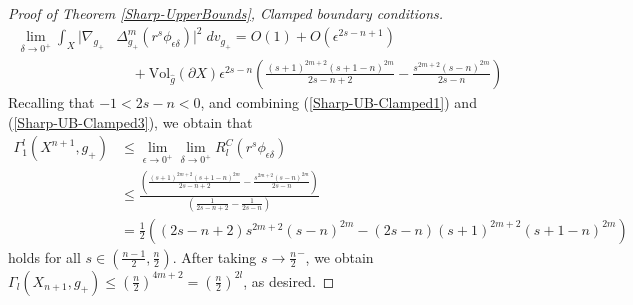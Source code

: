 \documentclass{amsart}
\newcommand{\Vol}{\text{Vol}}
\newcommand{\D}{\delta}
\newcommand{\E}{\epsilon}
\begin{document}
\begin{proof}[Proof of Theorem \ref{Sharp-UpperBounds}, Clamped boundary conditions]
\begin{equation}
\begin{split}
        \lim_{\D\to 0^+} \int_X|\nabla_{g_+}&\Delta^m_{g_+}(r^s\phi_{\E\D})|^2\;dv_{g_+} = O(1)+ O(\E^{2s-n+1})\\&\;\;\;\;+ \Vol_{\hat g}(\partial X)\E^{2s-n}\left(\frac{(s+1)^{2m+2}(s+1-n)^{2m}}{2s-n+2} -\frac{s^{2m+2}(s-n)^{2m}}{2s-n}\right)
    \end{split}
    \end{equation}
Recalling that $-1<2s-n<0$, and combining (\ref{Sharp-UB-Clamped1}) and (\ref{Sharp-UB-Clamped3}), we obtain that
\[
\begin{split}
    \Gamma^l_1(X^{n+1},g_+)&\le \lim_{\E\to0^+}\lim_{\D\to 0^+}R^C_l(r^s\phi_{\E\D}) \\& \le \frac{\displaystyle\left(\frac{(s+1)^{2m+2}(s+1-n)^{2m}}{2s-n+2} -\frac{s^{2m+2}(s-n)^{2m}}{2s-n}\right)}{\displaystyle\left(\frac{1}{2s -n + 2} - \frac{1}{2s-n}\right)} \\ &=\frac{1}{2}\left((2s-n+2)s^{2m+2}(s-n)^{2m} - (2s-n)(s+1)^{2m+2}(s+1-n)^{2m}\right)
\end{split}
\]
holds for all $s\in (\frac{n-1}{2}, \frac{n}{2})$. After taking $s\to\frac{n}{2}^-$, we obtain $\Gamma_l(X_{n+1},g_+)\le \left(\frac{n}{2}\right)^{4m+2} = \left(\frac{n}{2}\right)^{2l}$, as desired.
\end{proof}
\end{document}
